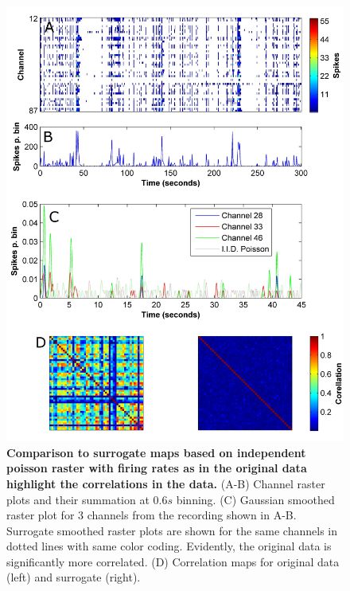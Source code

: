 \label{sec:methods:corrMaps}
\begin{figure}[!htb]
    \centering
    \includegraphics[width=14cm]{chapter2/figures/corrIllustration/corrIllustration.jpg}
    \caption[Computation of correlation maps]{\textbf{Comparison to surrogate maps based on independent poisson raster with firing rates as in the original data highlight the correlations in the data.} (A-B) Channel raster plots and their summation at \(0.6s\) binning. (C) Gaussian smoothed raster plot for 3 channels from the recording shown in A-B. Surrogate smoothed raster plots are shown for the same channels in dotted lines with same color coding. Evidently, the original data is significantly more correlated. (D) Correlation maps for original data (left) and surrogate (right).}

    \label{fig:methods:corrIllustration}

\end{figure}
